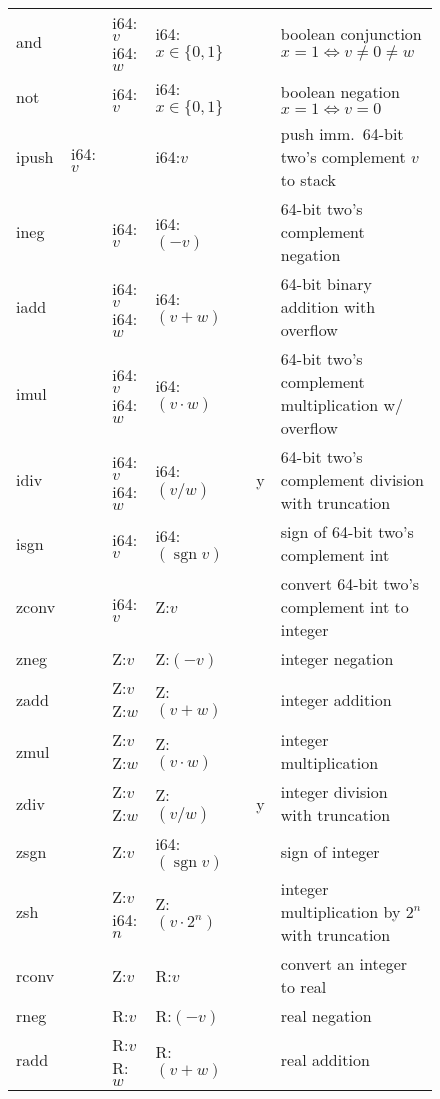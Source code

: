 \documentclass[a4paper,parskip=half]{scrartcl}
\begin{document}
\begin{figure}[h]
\begin{tabular}{l|l|l|l@{\;\,\vline\,}c@{\,\vline\,}c@{\,\vline\;\,}p{9cm}}
  \ttfamily and   &         & i64:$v$ i64:$w$ & i64:$x\in\{0,1\}$ &&& boolean conjunction $x=1\iff v\neq0\neq w$ \\
  \ttfamily not   &         & i64:$v$         & i64:$x\in\{0,1\}$ &&& boolean negation $x=1\iff v=0$ \\
  \hline
  \ttfamily ipush & i64:$v$ &                 & i64:$v$          && & push imm.\ 64-bit two's complement $v$ to stack \\
  \ttfamily ineg  &         & i64:$v$         & i64:$(-v)$       && & 64-bit two's complement negation \\
  \ttfamily iadd  &         & i64:$v$ i64:$w$ & i64:$(v+w)$      && & 64-bit binary addition with overflow \\
  \ttfamily imul  &         & i64:$v$ i64:$w$ & i64:$(v\cdot w)$ && & 64-bit two's complement multiplication w/ overflow \\
  \ttfamily idiv  &         & i64:$v$ i64:$w$ & i64:$(v/w)$      &&y& 64-bit two's complement division with truncation \\
  \ttfamily isgn  &         & i64:$v$         & i64:$(\operatorname{sgn}v)$ &&& sign of 64-bit two's complement int \\
  \hline
  \ttfamily zconv &         & i64:$v$         & Z:$v$            && & convert 64-bit two's complement int to integer \\
  \ttfamily zneg  &         & Z:$v$           & Z:$(-v)$         && & integer negation \\
  \ttfamily zadd  &         & Z:$v$ Z:$w$     & Z:$(v+w)$        && & integer addition \\
  \ttfamily zmul  &         & Z:$v$ Z:$w$     & Z:$(v\cdot w)$   && & integer multiplication \\
  \ttfamily zdiv  &         & Z:$v$ Z:$w$     & Z:$(v/w)$        &&y& integer division with truncation \\
  \ttfamily zsgn  &         & Z:$v$           & i64:$(\operatorname{sgn}v)$ &&& sign of integer \\
  \ttfamily zsh   &         & Z:$v$ i64:$n$   & Z:$(v\cdot2^n)$  && & integer multiplication by $2^n$ with truncation \\
  \hline
  \ttfamily rconv &         & Z:$v$           & R:$v$           & && convert an integer to real \\
  \ttfamily rneg  &         & R:$v$           & R:$(-v)$        & && real negation \\
  \ttfamily radd  &         & R:$v$ R:$w$     & R:$(v+w)$       & && real addition \\

\end{tabular}
\end{figure}
\end{document}
